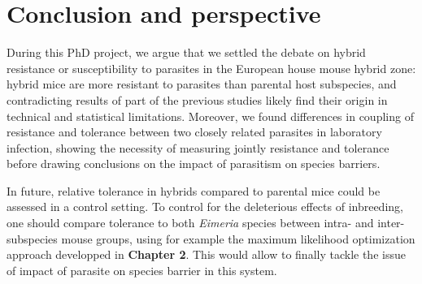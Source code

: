 \section{Conclusion and perspective}

During this PhD project, we argue that we settled the debate on hybrid resistance or susceptibility to parasites in the European house mouse hybrid zone: hybrid mice are more resistant to parasites than parental host subspecies, and contradicting results of part of the previous studies likely find their origin in technical and statistical limitations. Moreover, we found differences in coupling of resistance and tolerance between two closely related parasites in laboratory infection, showing the necessity of measuring jointly resistance and tolerance before drawing conclusions on the impact of parasitism on species barriers. \par

In future, relative tolerance in hybrids compared to parental mice could be assessed in a control setting. To control for the deleterious effects of inbreeding, one should compare tolerance to both \textit{Eimeria} species between intra- and inter-subspecies mouse groups, using for example the maximum likelihood optimization approach developped in \textbf{Chapter 2}. This would allow to finally tackle the issue of impact of parasite on species barrier in this system.
